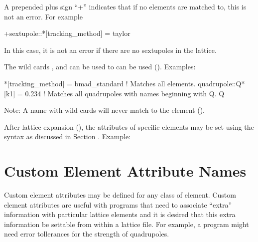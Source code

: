 {{A prepended plus sign ``+'' indicates that if no elements are matched to, this
is not an error. For example
\begin{example}
  +sextupole::*[tracking_method] = taylor
\end{example}
In this case, it is not an error if there are no sextupoles in the lattice.

The wild cards , and  can be used to can be used
(). Examples:
\begin{example}
  *[tracking_method] = bmad_standard  ! Matches all elements.
  quadrupole::Q*[k1] = 0.234    ! Matches all quadrupoles with names beginning with Q.
  Q%
\end{example}
Note: A name with wild cards will never match to the  element ().

After lattice expansion (), the attributes of specific elements
may be set using the syntax as discussed in Section . Example:

\section{Custom Element Attribute Names}
\label{s:custom.attrib}

Custom element attributes may be defined for any class of element.
Custom element attributes are useful with programs that need to
associate ``extra'' information with particular lattice elements and
it is desired that this extra information be settable from within a
lattice file. For example, a program might need error tollerances for
the strength of quadrupoles.

}}
